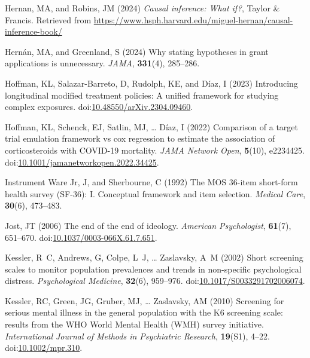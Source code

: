 \documentclass[
  single column]{article}
\newlength{\cslhangindent}
\newenvironment{CSLReferences}[2] %
 {\begin{list}{}{%
  \setlength{\itemindent}{0pt}
  \setlength{\leftmargin}{0pt}
  \setlength{\parsep}{0pt}
  \ifodd #1
   \setlength{\leftmargin}{\cslhangindent}
   \setlength{\itemindent}{-1\cslhangindent}
  \fi
  \setlength{\itemsep}{#2\baselineskip}}}
 {\end{list}}
\begin{document}
\begin{CSLReferences}{1}{0}
Hernan, MA, and Robins, JM (2024) \emph{Causal inference: What if?},
Taylor \& Francis. Retrieved from
\url{https://www.hsph.harvard.edu/miguel-hernan/causal-inference-book/}

Hernán, MA, and Greenland, S (2024) Why stating hypotheses in grant
applications is unnecessary. \emph{JAMA}, \textbf{331}(4), 285--286.

Hoffman, KL, Salazar-Barreto, D, Rudolph, KE, and Díaz, I (2023)
Introducing longitudinal modified treatment policies: A unified
framework for studying complex exposures.
doi:\href{https://doi.org/10.48550/arXiv.2304.09460}{10.48550/arXiv.2304.09460}.

Hoffman, KL, Schenck, EJ, Satlin, MJ, \ldots{} Díaz, I (2022) Comparison
of a target trial emulation framework vs cox regression to estimate the
association of corticosteroids with COVID-19 mortality. \emph{JAMA
Network Open}, \textbf{5}(10), e2234425.
doi:\href{https://doi.org/10.1001/jamanetworkopen.2022.34425}{10.1001/jamanetworkopen.2022.34425}.

Instrument Ware Jr, J, and Sherbourne, C (1992) The MOS 36-item
short-form health survey (SF-36): I. Conceptual framework and item
selection. \emph{Medical Care}, \textbf{30}(6), 473--483.

Jost, JT (2006) The end of the end of ideology. \emph{American
Psychologist}, \textbf{61}(7), 651--670.
doi:\href{https://doi.org/10.1037/0003-066X.61.7.651}{10.1037/0003-066X.61.7.651}.

Kessler, R~C, Andrews, G, Colpe, L~J, \ldots{} Zaslavsky, A~M (2002)
Short screening scales to monitor population prevalences and trends in
non-specific psychological distress. \emph{Psychological Medicine},
\textbf{32}(6), 959--976.
doi:\href{https://doi.org/10.1017/S0033291702006074}{10.1017/S0033291702006074}.

Kessler, RC, Green, JG, Gruber, MJ, \ldots{} Zaslavsky, AM (2010)
Screening for serious mental illness in the general population with the
K6 screening scale: results from the WHO World Mental Health (WMH)
survey initiative. \emph{International Journal of Methods in Psychiatric
Research}, \textbf{19}(S1), 4--22.
doi:\href{https://doi.org/10.1002/mpr.310}{10.1002/mpr.310}.


\end{CSLReferences}
\end{document}
